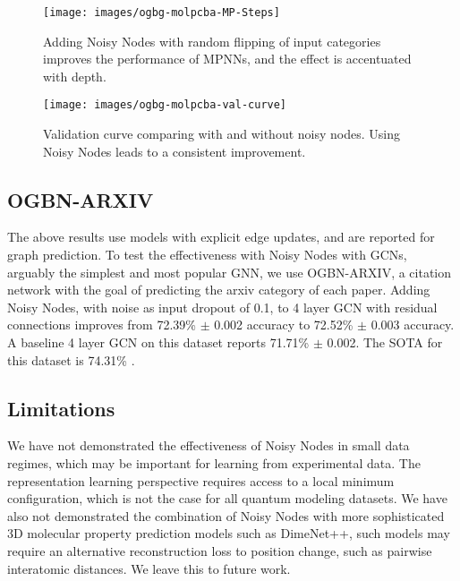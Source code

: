 \documentclass{article} \usepackage{iclr2022_conference,times}
\begin{document}
\begin{figure}[]
    \centering
    \begin{minipage}{0.45\textwidth}
        \centering
        \texttt{[image: images/ogbg-molpcba-MP-Steps]}
        \caption{Adding Noisy Nodes with random flipping of input categories improves the performance of MPNNs, and the effect is accentuated with depth.}
        \label{fig:ogbg-molpcba}
    \end{minipage}\hfill
    \begin{minipage}{0.45\textwidth}
        \centering
        \texttt{[image: images/ogbg-molpcba-val-curve]}
        \caption{Validation curve comparing with and without noisy nodes. Using Noisy Nodes leads to a consistent improvement.}
    \label{fig:molpcba_curve}
    \end{minipage}
\end{figure}



\subsection{OGBN-ARXIV}

The above results use models with explicit edge updates, and are reported for graph prediction. To test the effectiveness with Noisy Nodes with GCNs, arguably the simplest and most popular GNN, we use OGBN-ARXIV, a citation network with the goal of predicting the arxiv category of each paper. Adding Noisy Nodes, with noise as input dropout of 0.1, to 4 layer GCN with residual connections improves from 72.39\% $\pm$ 0.002 accuracy to 72.52\% $\pm$ 0.003 accuracy. A baseline 4 layer GCN on this dataset reports 71.71\% $\pm$ 0.002. The SOTA for this dataset is 74.31\% \citep{Sun2020AdaptiveGD}. 

\subsection{Limitations}\label{limitations}

We have not demonstrated the effectiveness of Noisy Nodes in small data regimes, which may be important for learning from experimental data. The representation learning perspective requires access to a local minimum configuration, which is not the case for all quantum modeling datasets. We have also not demonstrated the combination of Noisy Nodes with more sophisticated 3D molecular property prediction models such as DimeNet++\citep{Klicpera2020Dimenet++}, such models may require an alternative reconstruction loss to position change, such as pairwise interatomic distances. We leave this to future work.
\end{document}
